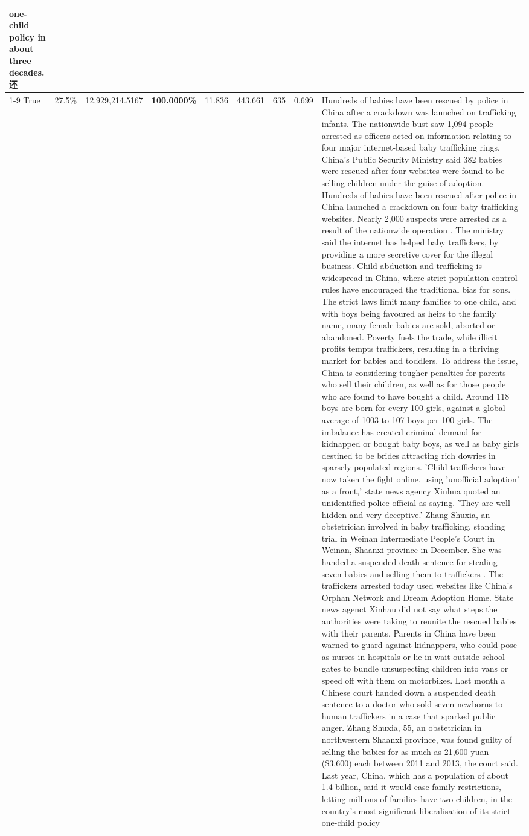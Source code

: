 \begin{table}[H]
\begin{tabular}{lllrlllll}
one-child policy in about three decades.还 \\
\cline{1-9}
True & 27.5\% & 12,929,214.5167 & \bfseries \color{red} 100.0000\% & 11.836 & 443.661 & 635 & 0.699 & Hundreds of babies have been rescued by police in China after a crackdown was launched on trafficking infants. The nationwide bust saw 1,094 people arrested as officers acted on information relating to four major internet-based baby trafficking rings. China's Public Security Ministry said 382 babies were rescued after four websites were found to be selling children under the guise of adoption. Hundreds of babies have been rescued after police in China launched a crackdown on four baby trafficking websites. Nearly 2,000 suspects were arrested as a result of the nationwide operation . The ministry said the internet has helped baby traffickers, by providing a more secretive cover for the illegal business. Child abduction and trafficking is widespread in China, where strict population control rules have encouraged the traditional bias for sons. The strict laws limit many families to one child, and with boys being favoured as heirs to the family name, many female babies are sold, aborted or abandoned. Poverty fuels the trade, while illicit profits tempts traffickers, resulting in a thriving market for babies and toddlers. To address the issue, China is considering tougher penalties for parents who sell their children, as well as for those people who are found to have bought a child. Around 118 boys are born for every 100 girls, against a global average of 1003 to 107 boys per 100 girls. The imbalance has created criminal demand for kidnapped or bought baby boys, as well as baby girls destined to be brides attracting rich dowries in sparsely populated regions. 'Child traffickers have now taken the fight online, using 'unofficial adoption' as a front,' state news agency Xinhua quoted an unidentified police official as saying. 'They are well-hidden and very deceptive.' Zhang Shuxia, an obstetrician involved in baby trafficking, standing trial in Weinan Intermediate People's Court in Weinan, Shaanxi province in December. She was handed a suspended death sentence for stealing seven babies and selling them to traffickers . The traffickers arrested today used websites like China's Orphan Network and Dream Adoption Home. State news agenct Xinhau did not say what steps the authorities were taking to reunite the rescued babies with their parents. Parents in China have been warned to guard against kidnappers, who could pose as nurses in hospitals or lie in wait outside school gates to bundle unsuspecting children into vans or speed off with them on motorbikes. Last month a Chinese court handed down a suspended death sentence to a doctor who sold seven newborns to human traffickers in a case that sparked public anger. Zhang Shuxia, 55, an obstetrician in northwestern Shaanxi province, was found guilty of selling the babies for as much as 21,600 yuan (\$3,600) each between 2011 and 2013, the court said. Last year, China, which has a population of about 1.4 billion, said it would ease family restrictions, letting millions of families have two children, in the country's most significant liberalisation of its strict one-child policy 
\end{tabular}
\end{table}
